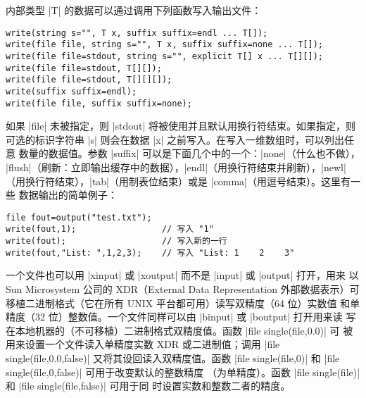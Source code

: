 \documentclass{ctexbook}
\newcommand*\prgname[1]{\textsf{#1}}
\begin{document}
内部类型 |T| 的数据可以通过调用下列函数写入输出文件：
\begin{lstlisting}
write(string s="", T x, suffix suffix=endl ... T[]);
write(file file, string s="", T x, suffix suffix=none ... T[]);
write(file file=stdout, string s="", explicit T[] x ... T[][]);
write(file file=stdout, T[][]);
write(file file=stdout, T[][][]);
write(suffix suffix=endl);
write(file file, suffix suffix=none);
\end{lstlisting}

如果 |file| 未被指定，则 |stdout| 将被使用并且默认用换行符结束。如果指定，则
可选的标识字符串 |s| 则会在数据 |x| 之前写入。在写入一维数组时，可以列出任意
数量的数据值。参数 |suffix| 可以是下面几个中的一个：|none|（什么也不做），
|flush|（刷新：立即输出缓存中的数据），|endl|（用换行符结束并刷新），|newl|
（用换行符结束），|tab|（用制表位结束）或是 |comma|（用逗号结束）。这里有一些
数据输出的简单例子：
\begin{lstlisting}
file fout=output("test.txt");
write(fout,1);                 // 写入 "1"
write(fout);                   // 写入新的一行
write(fout,"List: ",1,2,3);    // 写入 "List: 1    2    3"
\end{lstlisting}

一个文件也可以用 |xinput| 或 |xoutput| 而不是 |input| 或 |output| 打开，用来
以 Sun Microsystem 公司的 XDR（External Data Representation 外部数据表示）可
移植二进制格式（它在所有 \prgname{UNIX} 平台都可用）读写双精度（64 位）实数值
和单精度（32 位）整数值。一个文件同样可以由 |binput| 或 |boutput| 打开用来读
写在本地机器的（不可移植）二进制格式双精度值。函数 |file single(file,0.0)| 可
被用来设置一个文件读入单精度实数 XDR 或二进制值；调用
|file single(file,0.0,false)| 又将其设回读入双精度值。函数
|file single(file,0)| 和 |file single(file,0,false)| 可用于改变默认的整数精度
（为单精度）。函数 |file single(file)| 和 |file single(file,false)| 可用于同
时设置实数和整数二者的精度。
\end{document}
